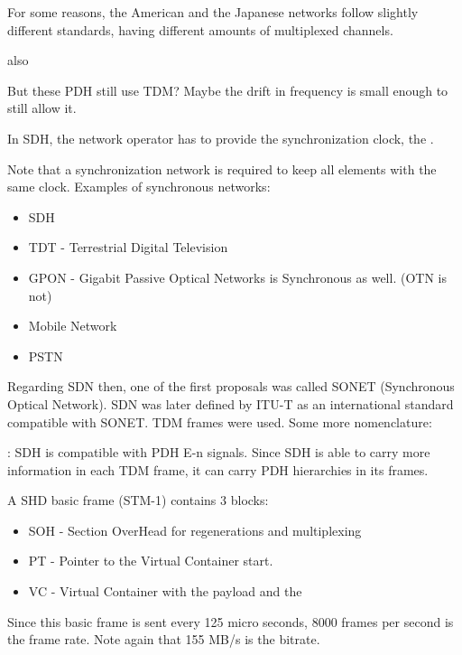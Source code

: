 For some reasons, the American and the Japanese networks follow slightly different standards, having different amounts of multiplexed channels.

 also



But these PDH still use TDM? Maybe the drift in frequency is small enough to still allow it.





In SDH, the network operator has to provide the synchronization clock, the .

Note that a synchronization network is required to keep all elements with the same clock. Examples of synchronous  networks:
\begin{itemize}
    \item SDH
    \item TDT - Terrestrial Digital Television
    \item GPON - Gigabit Passive Optical Networks is Synchronous as well. (OTN is not)
    \item Mobile Network
    \item PSTN 
\end{itemize}

Regarding SDN then, one of the first proposals was called SONET (Synchronous Optical Network). SDN was later defined by ITU-T as an international standard compatible with SONET. TDM frames were used. Some more nomenclature:




: SDH is compatible with PDH E-n signals. Since SDH is able to carry more information in each TDM frame, it can carry PDH hierarchies in its frames.

\vspace{.5cm}
A SHD basic frame (STM-1) contains 3 blocks:
\begin{itemize}
    \item SOH - Section OverHead for regenerations and multiplexing
    \item PT - Pointer to the Virtual Container start.
    \item VC - Virtual Container with the payload and the 
\end{itemize}


Since this basic frame is sent every 125 micro seconds, 8000 frames per second is the frame rate. Note again that 155 MB/s is the bitrate. 


